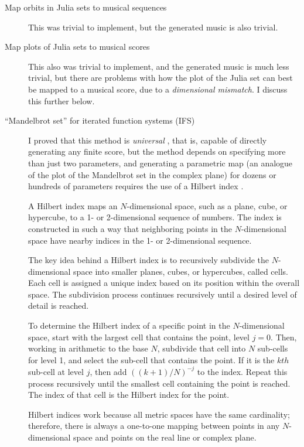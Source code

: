 \documentclass[11pt]{scrartcl}
\begin{document}
\begin{description}
\item[Map orbits in Julia sets to musical sequences] This was trivial to implement, but the generated music is also trivial.
\item[Map plots of Julia sets to musical scores] This also was trivial to implement, and the generated music is much less trivial, but there are problems with how the plot of the Julia set can best be mapped to a musical score, due to a \emph{dimensional mismatch}. I discuss this further below.
\item[``Mandelbrot set'' for iterated function systems (IFS)] I proved that this method is \emph{universal} \parencite{obsessed, gogins2023scoregraphs}, that is, capable of directly generating any finite score, but the method depends on specifying more than just two parameters, and generating a parametric map (an analogue of the plot of the Mandelbrot set in the complex plane) for dozens or hundreds of parameters requires the use of a Hilbert index \parencite{patrick1968mapping}. 

A Hilbert index maps an $N$-dimensional space, such as a plane, cube, or hypercube, to a 1- or 2-dimensional sequence of numbers. The index is constructed in such a way that neighboring points in the $N$-dimensional space have nearby indices in the 1- or 2-dimensional sequence.

The key idea behind a Hilbert index is to recursively subdivide the $N$-dimensional space into smaller planes, cubes, or hypercubes, called cells. Each cell is assigned a unique index based on its position within the overall space. The subdivision process continues recursively until a desired level of detail is reached.

To determine the Hilbert index of a specific point in the $N$-dimensional space, start with the largest cell that contains the point, level $j = 0$. Then, working in arithmetic to the base $N$, subdivide that cell into $N$ sub-cells for level 1, and select the sub-cell that contains the point. If it is the $kth$ sub-cell at level $j$, then add $((k + 1)/N)^{-j}$ to the index. Repeat this process recursively until the smallest cell containing the point is reached. The index of that cell is  the Hilbert index for the point.
  
Hilbert indices work because all metric spaces have the same cardinality; therefore, there is always a one-to-one mapping between points in any $N$-dimensional space and points on the real line or complex plane.


\end{description}
\end{document}
